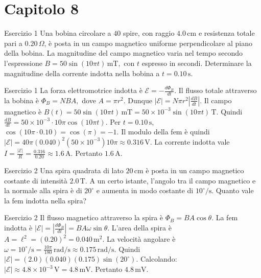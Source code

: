 \documentclass[a4paper]{article}
\begin{document}
\section{Capitolo 8}
\begin{snippetexercise}{Esercizio 1}
    Una bobina circolare a \(40\) spire, con raggio \(4.0\,\mathrm{cm}\) e
    resistenza totale pari a \(0.20\,\Omega\), è posta in un campo magnetico
    uniforme perpendicolare al piano della bobina. La magnitudine del campo
    magnetico varia nel tempo secondo l'espressione
    \(B = 50\sin(10\pi t)\,\mathrm{mT},\)
    con \(t\) espresso in secondi. Determinare la magnitudine della corrente
    indotta nella bobina a \(t = 0.10\,\mathrm{s}\).

\end{snippetexercise}
\begin{snippetsolution}{Esercizio 1}
    La forza elettromotrice indotta è
    \(\mathcal{E} = -\frac{d\Phi_B}{dt}.\)
    Il flusso totale attraverso la bobina è
    \(\Phi_B = NBA,\)
    dove
    \(A = \pi r^2.\)
    Dunque
    \(|\mathcal{E}| = N\pi r^2\left|\frac{dB}{dt}\right|.\)
    Il campo magnetico è
    \(B(t) = 50\sin(10\pi t)\,\mathrm{mT} = 50 \times 10^{-3}\sin(10\pi t)\,\mathrm{T}.\)
    Quindi
    \(\frac{dB}{dt} = 50 \times 10^{-3} \cdot 10\pi \cos(10\pi t).\)
    Per \(t = 0.10\,\mathrm{s}\),
    \(\cos(10\pi \cdot 0.10)=\cos(\pi)=-1.\)
    Il modulo della fem è quindi
    \(|\mathcal{E}| = 40\pi(0.040)^2 \left(50 \times 10^{-3}\right) 10\pi \approx 0.316\,\mathrm{V}.\)
    La corrente indotta vale
    \(I = \frac{|\mathcal{E}|}{R} = \frac{0.316}{0.20} \approx 1.6\,\mathrm{A}.\)
    Pertanto
    \(\boxed{1.6\,\mathrm{A}}.\)
\end{snippetsolution}
\begin{snippetexercise}{Esercizio 2}
    Una spira quadrata di lato \(20\,\mathrm{cm}\) è posta in un campo
    magnetico costante di intensità \(2.0\,\mathrm{T}\). A un certo istante,
    l'angolo tra il campo magnetico e la normale alla spira è di \(20^\circ\)
    e aumenta in modo costante di \(10^\circ/\mathrm{s}\). Quanto vale la fem
    indotta nella spira?

\end{snippetexercise}
\begin{snippetsolution}{Esercizio 2}
    Il flusso magnetico attraverso la spira è
    \(\Phi_B = BA\cos\theta.\)
    La fem indotta è
    \(|\mathcal{E}| = \left|\frac{d\Phi_B}{dt}\right| = BA\omega\sin\theta.\)
    L'area della spira è
    \(A = \ell^2 = (0.20)^2 = 0.040\,\mathrm{m^2}.\)
    La velocità angolare è
    \(\omega = 10^\circ/\mathrm{s} = \frac{10\pi}{180}\,\mathrm{rad/s} \approx 0.175\,\mathrm{rad/s}.\)
    Quindi
    \(|\mathcal{E}| = (2.0)(0.040)(0.175)\sin(20^\circ).\)
    Calcolando:
    \(|\mathcal{E}| \approx 4.8 \times 10^{-3}\,\mathrm{V} = 4.8\,\mathrm{mV}.\)
    Pertanto
    \(\boxed{4.8\,\mathrm{mV}}.\)
\end{snippetsolution}
\end{document}
